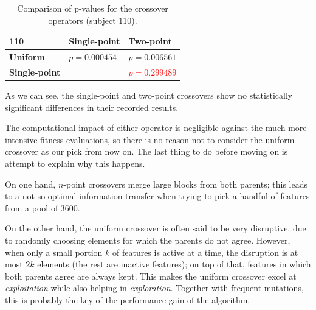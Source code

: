     \begin{table}[h]

        \centering
        \setlength\arrayrulewidth{0.8pt}

        \begin{tabular}{| >{\centering\arraybackslash}m{0.9in} | >{\centering\arraybackslash}m{0.9in} | >{\centering\arraybackslash}m{0.9in} |}

            \hline
            \rowcolor{RoyalBlue}
            \textbf{110} & \textbf{Single-point} & \textbf{Two-point} \\
            \hline
            \cellcolor{RoyalBlue}\textbf{Uniform} & $p = 0.000454$ & $p = 0.006561$ \\
            \hline
            \cellcolor{RoyalBlue}\textbf{Single-point} & \cellcolor{lightgray} & \textcolor{red}{$p = 0.299489$} \\
            \hline

        \end{tabular}

        \caption{Comparison of p-values for the crossover operators (subject 110).}\label{table:crossover_kruskal_110}

    \end{table}

    As we can see, the single-point and two-point crossovers show no statistically significant differences in their recorded results.

    The computational impact of either operator is negligible against the much more intensive fitness evaluations, so there is no reason not to consider the uniform crossover as our pick from now on. The last thing to do before moving on is attempt to explain why this happens. 

    On one hand, $n$-point crossovers merge large blocks from both parents; this leads to a not-so-optimal information transfer when trying to pick a handful of features from a pool of 3600.

    On the other hand, the uniform crossover is often said to be very disruptive, due to randomly choosing elements for which the parents do not agree. However, when only a small portion $k$ of features is active at a time, the disruption is at most $2k$ elements (the rest are inactive features); on top of that, features in which both parents agree are always kept. This makes the uniform crossover excel at \textit{exploitation} while also helping in \textit{exploration}. Together with frequent mutations, this is probably the key of the performance gain of the algorithm.

